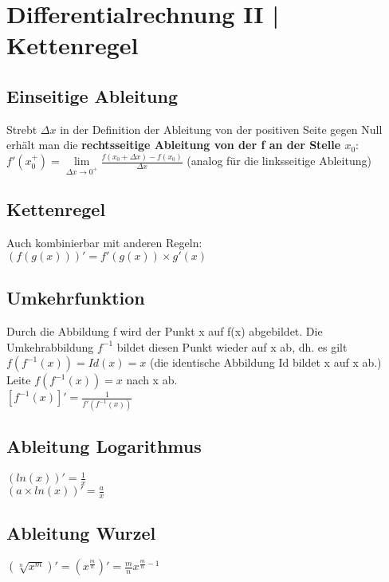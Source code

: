 \documentclass[../main.tex]{subfiles}
\begin{document}

\chapter{Differentialrechnung II | Kettenregel}
\section{Einseitige Ableitung}
Strebt $\Delta x$ in der Definition der Ableitung von der positiven Seite gegen Null erhält man die \textbf{rechtsseitige Ableitung von der f an der Stelle $x_0$}: \\ [7pt]
$f'(x_0^+) = \lim\limits_{\Delta x \to 0^+} \frac{f(x_0 + \Delta x) - f(x_0)}{\Delta x}$ (analog für die linksseitige Ableitung)

\section{Kettenregel}
Auch kombinierbar mit anderen Regeln: \\ [7pt]
$(f(g(x)))' = f'(g(x)) \times g'(x)$

\section{Umkehrfunktion}
Durch die Abbildung f wird der Punkt x auf f(x) abgebildet. Die Umkehrabbildung $f^{-1}$ bildet diesen Punkt wieder auf x ab, dh. es gilt $f(f^{-1}(x)) = Id(x) = x$ (die identische Abbildung Id bildet x auf x ab.) \\ [7pt]
Leite $f(f^{-1}(x)) = x$ nach x ab. \\ [7pt]
$[f^{-1}(x)]' = \frac{1}{f'(f^{-1}(x))}$

\section{Ableitung Logarithmus}
$(ln(x))' = \frac{1}{x}$ \\ [7pt]
$(a \times ln(x))' = \frac{a}{x}$

\section{Ableitung Wurzel}
$(\sqrt[n]{x^m})' = (x^{\frac{m}{n}})' = \frac{m}{n}x^{\frac{m}{n}-1}$
\end{document}
